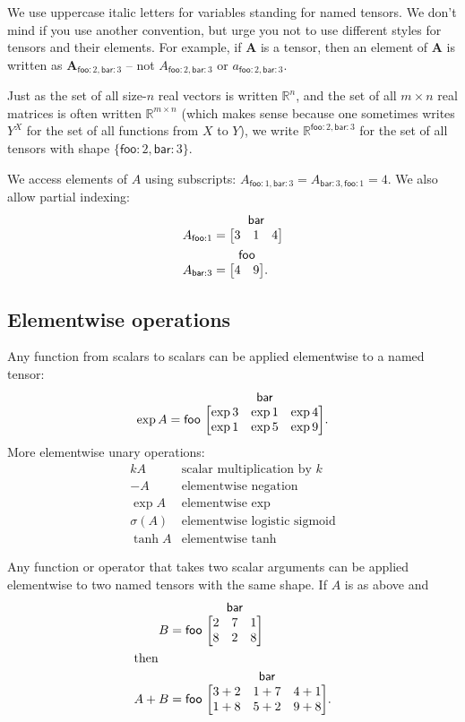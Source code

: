 \documentclass{article}
\makeatletter
\newcommand{\name}[1]{\mathsf{#1}}
\newcommand{\tuple}[1]{\{ #1\}}
\newcommand{\namedmatrix}[3]{%
\ifx #1\end\end \else #1\ \fi
\begin{array}[b]{@{}c@{}} \smash{#2} \\ \begin{bmatrix} #3 \end{bmatrix} \end{array}
}
\makeatother
\begin{document}
We use uppercase italic letters for variables standing for named tensors. We don't mind if you use another convention, but urge you not to use different styles for tensors and their elements. For example, if $\mathbf{A}$ is a tensor, then an element of $\mathbf{A}$ is written as $\mathbf{A}_{\name{foo}:2, \name{bar}:3}$ -- 
not $A_{\name{foo}:2,\name{bar}:3}$ or $a_{\name{foo}:2,\name{bar}:3}$.

Just as the set of all size-$n$ real vectors is written $\mathbb{R}^n$, and the set of all $m\times n$ real matrices is often written $\mathbb{R}^{m \times n}$ (which makes sense because one sometimes writes $Y^X$ for the set of all functions from $X$ to $Y$), we write $\mathbb{R}^{\name{foo}: 2, \name{bar}: 3}$ for the set of all tensors with shape $\tuple{\name{foo}:2, \name{bar}:3}$.

We access elements of $A$ using subscripts: $A_{\name{foo}: 1, \name{bar}: 3} = A_{\name{bar}: 3, \name{foo}: 1} = 4$.
We also allow partial indexing:
\begin{align*}
A_{\name{foo}:1} &= \namedmatrix{}{\name{bar}}{
  3 & 1 & 4
}
\\
A_{\name{bar}:3} &= \namedmatrix{}{\name{foo}}{
  4 & 9
}.
\end{align*}

\subsection{Elementwise operations}

Any function from scalars to scalars can be applied elementwise to a named tensor:
\begin{equation*}
\exp A = \namedmatrix{\name{foo}}{\name{bar}}{
  \exp 3 & \exp 1 & \exp 4 \\
  \exp 1 & \exp 5 & \exp 9
}.
\end{equation*}
More elementwise unary operations:
\[\begin{array}{cl}
kA & \text{scalar multiplication by $k$} \\
-A & \text{elementwise negation} \\
\exp A & \text{elementwise $\exp$} \\
\sigma(A) & \text{elementwise logistic sigmoid} \\
\tanh A & \text{elementwise $\tanh$}
\end{array}\]

Any function or operator that takes two scalar arguments can be applied elementwise to two named tensors with the same shape. If $A$ is as above and
\begin{align*}
B &= \namedmatrix{\name{foo}}{\name{bar}}{
  2 & 7 & 1 \\
  8 & 2 & 8
} \\
\intertext{then}
A + B &= \namedmatrix{\name{foo}}{\name{bar}}{
  3+2 & 1+7 & 4+1 \\
  1+8 & 5+2 & 9+8
}.
\end{align*}
\end{document}
